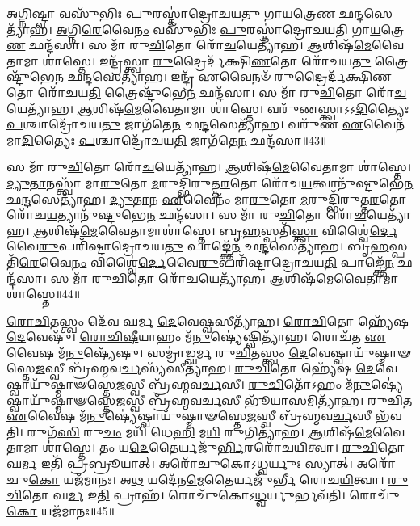 \-\ul{𑌅}\-𑌗𑍍𑌨𑌿\-\ul{𑌷𑍍𑌟𑍍𑌵𑌾} 𑌵𑌸𑍁᳴𑌭𑌿𑌃 \ul{𑌪𑍁}\-𑌰𑌸𑍍𑌤𑌾॑𑌦𑍍𑌰𑍋𑌚𑌯𑌤𑍁 𑌗𑌾\-\ul{𑌯}\-𑌤𑍍𑌰𑍇\-\ul{𑌣} 𑌛\-\ul{𑌨𑍍𑌦}\-𑌸𑍇𑌤𑍍𑌯𑌾᳴𑌹। 
\-\ul{𑌅}\-𑌗𑍍𑌨𑌿\-\ul{𑌰𑍇}\-𑌵𑍈\-\ul{𑌨𑌂} 𑌵𑌸𑍁᳴𑌭𑌿𑌃 \ul{𑌪𑍁}\-𑌰𑌸𑍍𑌤𑌾॑𑌦𑍍𑌰𑍋𑌚𑌯𑌤𑌿 𑌗𑌾\-\ul{𑌯}\-𑌤𑍍𑌰𑍇\-\ul{𑌣} 𑌛𑌨𑍍𑌦᳴𑌸𑌾। 
𑌸 𑌮𑌾᳴ 𑌰𑍁\-\ul{𑌚𑌿}\-𑌤𑍋 𑌰𑍋᳴\-\ul{𑌚}\-𑌯𑍇𑌤𑍍𑌯𑌾᳴𑌹। 
\-\ul{𑌆}\-𑌶𑌿𑌷᳴\-\ul{𑌮𑍇}\-𑌵𑍈𑌤𑌾𑌮𑌾 𑌶𑌾॑𑌸𑍍𑌤𑍇। 
𑌇𑌨𑍍𑌦𑍍𑌰᳴𑌸𑍍𑌤𑍍𑌵𑌾 \ul{𑌰𑍁}\-𑌦𑍍𑌰𑍈𑌰𑍍𑌦᳴𑌕𑍍𑌷𑌿\-\ul{𑌣}\-𑌤𑍋 𑌰𑍋᳴𑌚𑌯\-\ul{𑌤𑍁} 𑌤𑍍𑌰𑍈𑌷𑍍𑌟𑍁᳴𑌭𑍇\-\ul{𑌨} 𑌛\-\ul{𑌨𑍍𑌦}\-𑌸𑍇𑌤𑍍𑌯𑌾᳴𑌹। 
𑌇𑌨𑍍𑌦𑍍𑌰᳴ \ul{𑌏}\-𑌵𑍈𑌨𑍞᳴ \ul{𑌰𑍁}\-𑌦𑍍𑌰𑍈𑌰𑍍𑌦᳴𑌕𑍍𑌷𑌿\-\ul{𑌣}\-𑌤𑍋 𑌰𑍋᳴𑌚𑌯\-\ul{𑌤𑌿} 𑌤𑍍𑌰𑍈𑌷𑍍𑌟𑍁᳴𑌭𑍇\-\ul{𑌨} 𑌛𑌨𑍍𑌦᳴𑌸𑌾। 
𑌸 𑌮𑌾᳴ 𑌰𑍁\-\ul{𑌚𑌿}\-𑌤𑍋 𑌰𑍋᳴\-\ul{𑌚}\-𑌯𑍇𑌤𑍍𑌯𑌾᳴𑌹। 
\-\ul{𑌆}\-𑌶𑌿𑌷᳴\-\ul{𑌮𑍇}\-𑌵𑍈𑌤𑌾𑌮𑌾 𑌶𑌾॑𑌸𑍍𑌤𑍇। 
𑌵𑌰𑍁᳴𑌣𑌸𑍍𑌤𑍍𑌵𑌾𑌽𑌽\-\ul{𑌦𑌿}\-𑌤𑍍𑌯𑍈𑌃 \ul{𑌪}\-𑌶𑍍𑌚𑌾𑌦𑍍𑌰𑍋᳴𑌚𑌯\-\ul{𑌤𑍁} 𑌜𑌾𑌗᳴𑌤𑍇\-\ul{𑌨} 𑌛\-\ul{𑌨𑍍𑌦}\-𑌸𑍇𑌤𑍍𑌯𑌾᳴𑌹। 
𑌵𑌰𑍁᳴𑌣 \ul{𑌏}\-𑌵𑍈𑌨᳴𑌮𑌾\-\ul{𑌦𑌿}\-𑌤𑍍𑌯𑍈𑌃 \ul{𑌪}\-𑌶𑍍𑌚𑌾𑌦𑍍𑌰𑍋᳴𑌚𑌯\-\ul{𑌤𑌿} 𑌜𑌾𑌗᳴𑌤𑍇\-\ul{𑌨} 𑌛𑌨𑍍𑌦᳴𑌸𑌾॥43॥

𑌸 𑌮𑌾᳴ 𑌰𑍁\-\ul{𑌚𑌿}\-𑌤𑍋 𑌰𑍋᳴\-\ul{𑌚}\-𑌯𑍇𑌤𑍍𑌯𑌾᳴𑌹। 
\-\ul{𑌆}\-𑌶𑌿𑌷᳴\-\ul{𑌮𑍇}\-𑌵𑍈𑌤𑌾𑌮𑌾 𑌶𑌾॑𑌸𑍍𑌤𑍇। 
\-\ul{𑌦𑍍𑌯𑍁}\-\-\ul{𑌤𑌾}\-𑌨𑌸𑍍𑌤𑍍𑌵𑌾᳴ 𑌮𑌾\-\ul{𑌰𑍁}\-𑌤𑍋 \ul{𑌮}\-𑌰𑍁𑌦𑍍𑌭𑌿᳴𑌰𑍁𑌤𑍍𑌤\-\ul{𑌰}\-𑌤𑍋 𑌰𑍋᳴𑌚\-\ul{𑌯}\-𑌤𑍍𑌵𑌾𑌨𑍁᳴𑌷𑍍𑌟𑍁𑌭𑍇\-\ul{𑌨} 𑌛\-\ul{𑌨𑍍𑌦}\-𑌸𑍇𑌤𑍍𑌯𑌾᳴𑌹। 
\-\ul{𑌦𑍍𑌯𑍁}\-\-\ul{𑌤𑌾}\-𑌨 \ul{𑌏}\-𑌵𑍈𑌨𑌂᳴ 𑌮𑌾\-\ul{𑌰𑍁}\-𑌤𑍋 \ul{𑌮}\-𑌰𑍁𑌦𑍍𑌭𑌿᳴𑌰𑍁𑌤𑍍𑌤\-\ul{𑌰}\-𑌤𑍋 𑌰𑍋᳴𑌚\-\ul{𑌯}\-𑌤𑍍𑌯𑌾𑌨𑍁᳴𑌷𑍍𑌟𑍁𑌭𑍇\-\ul{𑌨} 𑌛𑌨𑍍𑌦᳴𑌸𑌾। 
𑌸 𑌮𑌾᳴ 𑌰𑍁\-\ul{𑌚𑌿}\-𑌤𑍋 𑌰𑍋᳴\-\ul{𑌚}\-𑌯𑍇𑌤𑍍𑌯𑌾᳴𑌹। 
\-\ul{𑌆}\-𑌶𑌿𑌷᳴\-\-\ul{𑌮𑍇}\-𑌵𑍈𑌤𑌾𑌮𑌾𑌶𑌾॑𑌸𑍍𑌤𑍇। 
𑌬𑍃\-\ul{𑌹}\-𑌸𑍍𑌪𑌤𑌿᳴\-\ul{𑌸𑍍𑌤𑍍𑌵𑌾} 𑌵𑌿𑌶𑍍𑌵𑍈॑\-\ul{𑌰𑍍𑌦𑍇}\-𑌵𑍈\-\ul{𑌰𑍁}\-𑌪𑌰𑌿᳴𑌷𑍍𑌟𑌾\-𑌦𑍍𑌰𑍋𑌚𑌯\-\ul{𑌤𑍁} 𑌪𑌾𑌙𑍍𑌕𑍍𑌤𑍇᳴\-\ul{𑌨} 𑌛\-\ul{𑌨𑍍𑌦}\-𑌸𑍇𑌤𑍍𑌯𑌾᳴𑌹। 
𑌬𑍃\-\ul{𑌹}\-𑌸𑍍𑌪𑌤𑌿᳴\-\ul{𑌰𑍇}\-𑌵𑍈\-\ul{𑌨𑌂}  𑌵𑌿𑌶𑍍𑌵𑍈॑\-\ul{𑌰𑍍𑌦𑍇}\-𑌵𑍈\-\-\ul{𑌰𑍁}\-𑌪𑌰𑌿᳴𑌷𑍍𑌟𑌾𑌦𑍍𑌰𑍋𑌚𑌯\-\ul{𑌤𑌿} 𑌪𑌾𑌙𑍍𑌕𑍍𑌤𑍇᳴\-\ul{𑌨} 𑌛𑌨𑍍𑌦᳴𑌸𑌾। 
𑌸 𑌮𑌾᳴ 𑌰𑍁\-\ul{𑌚𑌿}\-𑌤𑍋 𑌰𑍋᳴\-\ul{𑌚}\-𑌯𑍇𑌤𑍍𑌯𑌾᳴𑌹। 
\-\ul{𑌆}\-𑌶𑌿𑌷᳴\-\ul{𑌮𑍇}\-𑌵𑍈𑌤𑌾𑌮𑌾 𑌶𑌾॑𑌸𑍍𑌤𑍇॥44॥

\-\ul{𑌰𑍋}\-\-\ul{𑌚𑌿}\-𑌤𑌸𑍍𑌤𑍍𑌵𑌂 𑌦𑍇᳴𑌵 𑌘𑌰𑍍𑌮 \ul{𑌦𑍇}\-𑌵𑍇𑌷𑍍𑌵𑌸𑍀𑌤𑍍𑌯𑌾᳴𑌹। 
\-\ul{𑌰𑍋}\-\-\ul{𑌚𑌿}\-𑌤𑍋 𑌹𑍍𑌯𑍇᳴𑌷 \ul{𑌦𑍇}\-𑌵𑍇𑌷𑍁᳴। 
\-\ul{𑌰𑍋}\-\-\ul{𑌚𑌿}\-\-\ul{𑌷𑍀}\-𑌯𑌾𑌹𑌂 𑌮᳴\-\ul{𑌨𑍁}\-𑌷𑍍𑌯𑍇॑𑌷𑍍𑌵𑌿𑌤𑍍𑌯𑌾᳴𑌹। 
𑌰𑍋𑌚᳴𑌤 \ul{𑌏}\-𑌵𑍈𑌷 𑌮᳴\-\ul{𑌨𑍁}\-𑌷𑍍𑌯𑍇᳴𑌷𑍁। 
𑌸𑌮𑍍𑌰𑌾॑𑌡𑍍𑌘𑌰𑍍𑌮 𑌰𑍁\-\ul{𑌚𑌿}\-𑌤𑌸𑍍𑌤𑍍𑌵𑌂 \ul{𑌦𑍇}\-𑌵𑍇𑌷𑍍𑌵𑌾𑌯𑍁᳴𑌷𑍍𑌮𑌾𑍟𑌸𑍍𑌤𑍇\-\ul{𑌜}\-𑌸𑍍𑌵𑍀 𑌬𑍍𑌰᳴𑌹𑍍𑌮𑌵\-\ul{𑌰𑍍𑌚}\-𑌸𑍍𑌯᳴𑌸𑍀𑌤𑍍𑌯𑌾᳴𑌹। 
\-\ul{𑌰𑍁}\-\-\ul{𑌚𑌿}\-𑌤𑍋 𑌹𑍍𑌯𑍇᳴𑌷 \ul{𑌦𑍇}\-𑌵𑍇𑌷𑍍𑌵𑌾𑌯𑍁᳴𑌷𑍍𑌮𑌾𑍟𑌸𑍍𑌤𑍇\-\ul{𑌜}\-𑌸𑍍𑌵𑍀 𑌬𑍍𑌰᳴𑌹𑍍𑌮𑌵\-\ul{𑌰𑍍𑌚}\-𑌸𑍀। 
\-\ul{𑌰𑍁}\-\-\ul{𑌚𑌿}\-𑌤𑍋᳴𑌽𑌹𑌂 𑌮᳴\-\ul{𑌨𑍁}\-𑌷𑍍𑌯𑍇॑𑌷𑍍𑌵𑌾𑌯𑍁᳴𑌷𑍍𑌮𑌾𑍟𑌸𑍍𑌤𑍇\-\ul{𑌜}\-𑌸𑍍𑌵𑍀 𑌬𑍍𑌰᳴𑌹𑍍𑌮𑌵\-\ul{𑌰𑍍𑌚}\-𑌸𑍀 𑌭𑍂᳴𑌯𑌾\-\ul{𑌸}\-𑌮𑌿𑌤𑍍𑌯𑌾᳴𑌹। 
\-\ul{𑌰𑍁}\-\-\ul{𑌚𑌿}\-𑌤 \ul{𑌏}\-𑌵𑍈𑌷 𑌮᳴\-\ul{𑌨𑍁}\-𑌷𑍍𑌯𑍇॑𑌷𑍍𑌵𑌾𑌯𑍁᳴𑌷𑍍𑌮𑌾𑍟𑌸𑍍𑌤𑍇\-\ul{𑌜}\-𑌸𑍍𑌵𑍀 𑌬𑍍𑌰᳴𑌹𑍍𑌮𑌵\-\ul{𑌰𑍍𑌚}\-𑌸𑍀 𑌭᳴𑌵𑌤𑌿। 
𑌰𑍁𑌗᳴\-\ul{𑌸𑌿} 𑌰𑍁\-\ul{𑌚𑌂} 𑌮𑌯𑌿᳴ 𑌧𑍇\-\ul{𑌹𑌿} 𑌮\-\ul{𑌯𑌿} 𑌰𑍁𑌗𑌿𑌤𑍍𑌯𑌾᳴𑌹। 
\-\ul{𑌆}\-𑌶𑌿𑌷᳴\-\ul{𑌮𑍇}\-𑌵𑍈𑌤𑌾𑌮𑌾 𑌶𑌾॑𑌸𑍍𑌤𑍇। 
𑌤𑌂 𑌯\-\ul{𑌦𑍇}\-𑌤𑍈𑌰𑍍𑌯𑌜𑍁᳴\-\ul{𑌰𑍍𑌭𑌿}\-𑌰𑌰𑍋᳴𑌚𑌯𑌿𑌤𑍍𑌵𑌾। 
\-\ul{𑌰𑍁}\-\-\ul{𑌚𑌿}\-𑌤𑍋 \ul{𑌘}\-𑌰𑍍𑌮 𑌇𑌤𑌿᳴ 𑌪𑍍𑌰\-\ul{𑌬𑍍𑌰𑍂}\-𑌯𑌾𑌤𑍍। 
𑌅𑌰𑍋᳴𑌚𑍁𑌕𑍋𑌽\-\ul{𑌧𑍍𑌵}\-𑌰𑍍𑌯𑍁𑌃 𑌸𑍍𑌯𑌾𑌤𑍍। 
𑌅𑌰𑍋᳴𑌚𑍁\-\ul{𑌕𑍋} 𑌯𑌜᳴𑌮𑌾𑌨𑌃। 
𑌅\-\ul{𑌥} 𑌯𑌦𑍇᳴𑌨\-\ul{𑌮𑍇}\-𑌤𑍈𑌰𑍍𑌯𑌜𑍁᳴𑌰𑍍𑌭𑍀 𑌰𑍋𑌚\-\ul{𑌯𑌿}\-𑌤𑍍𑌵𑌾। 
\-\ul{𑌰𑍁}\-\-\ul{𑌚𑌿}\-𑌤𑍋 𑌘\-\ul{𑌰𑍍𑌮} 𑌇\-\ul{𑌤𑌿} 𑌪𑍍𑌰𑌾𑌹᳴। 
𑌰𑍋𑌚𑍁᳴𑌕𑍋𑌽\-\ul{𑌧𑍍𑌵}\-𑌰𑍍𑌯𑍁𑌰𑍍𑌭𑌵᳴𑌤𑌿। 
𑌰𑍋𑌚𑍁᳴\-\ul{𑌕𑍋} 𑌯𑌜᳴𑌮𑌾𑌨𑌃॥45॥
\anuvakamend[\-\ul{𑌪}\-𑌶𑍍𑌚𑌾𑌦𑍍𑌰𑍋᳴𑌚𑌯\-\ul{𑌤𑌿} 𑌜𑌾𑌗᳴𑌤𑍇\-\ul{𑌨} 𑌛𑌨𑍍𑌦᳴\-\ul{𑌸𑌾} 𑌪𑌾𑌙𑍍𑌕𑍍𑌤𑍇᳴\-\ul{𑌨} 𑌛𑌨𑍍𑌦᳴\-\ul{𑌸𑌾} 𑌸 𑌮𑌾᳴ 𑌰𑍁\-\ul{𑌚𑌿}\-𑌤𑍋 𑌰𑍋᳴\-\ul{𑌚}\-𑌯𑍇𑌤𑍍𑌯𑌾᳴\-\ul{𑌹𑌾}\-𑌶𑌿𑌷᳴\-\ul{𑌮𑍇}\-𑌵𑍈𑌤𑌾𑌮𑌾𑌶𑌾॑𑌸𑍍𑌤𑍇 𑌶𑌾\-\ul{𑌸𑍍𑌤𑍇}\-𑌽𑌷𑍍𑌟𑍗 𑌚᳴]

